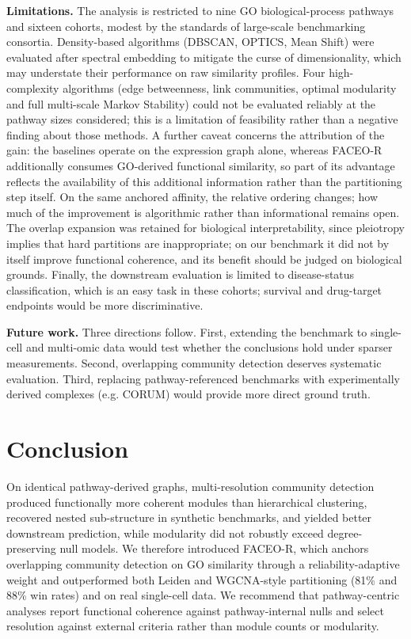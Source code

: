 \documentclass[twocolumn,10pt,letterpaper]{article}
\begin{document}
\noindent\textbf{Limitations.} The analysis is restricted to nine GO biological-process
pathways and sixteen cohorts, modest by the standards of large-scale benchmarking consortia.
Density-based algorithms (DBSCAN, OPTICS, Mean Shift) were evaluated after spectral embedding
to mitigate the curse of dimensionality, which may understate their performance on raw
similarity profiles. Four high-complexity algorithms (edge betweenness, link communities,
optimal modularity and full multi-scale Markov Stability) could not be evaluated reliably at
the pathway sizes considered; this is a limitation of feasibility rather than a negative
finding about those methods. A further caveat concerns the attribution of the gain: the
baselines operate on the expression graph alone, whereas FACEO-R additionally consumes
GO-derived functional similarity, so part of its advantage reflects the availability of this
additional information rather than the partitioning step itself. On the same anchored
affinity, the relative ordering changes; how much of the improvement is algorithmic rather
than informational remains open. The overlap expansion was retained for biological
interpretability, since pleiotropy implies that hard partitions are inappropriate; on our
benchmark it did not by itself improve functional coherence, and its benefit should be judged
on biological grounds. Finally, the downstream evaluation is limited to disease-status
classification, which is an easy task in these cohorts; survival and drug-target endpoints
would be more discriminative.

\noindent\textbf{Future work.} Three directions follow. First, extending the benchmark to
single-cell and multi-omic data would test whether the conclusions hold under sparser
measurements. Second, overlapping community detection deserves systematic evaluation. Third,
replacing pathway-referenced benchmarks with experimentally derived complexes (e.g. CORUM)
would provide more direct ground truth.

\section{Conclusion}

On identical pathway-derived graphs, multi-resolution community detection produced
functionally more coherent modules than hierarchical clustering, recovered nested
sub-structure in synthetic benchmarks, and yielded better downstream prediction, while
modularity did not robustly exceed degree-preserving null models. We therefore introduced
FACEO-R, which anchors overlapping community detection on GO similarity through a
reliability-adaptive weight and outperformed both Leiden and WGCNA-style partitioning
(81\% and 88\% win rates) and on real single-cell data. We recommend that pathway-centric
analyses report functional coherence against pathway-internal nulls and select resolution
against external criteria rather than module counts or modularity.
\end{document}
